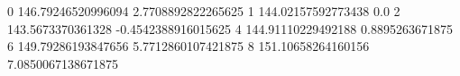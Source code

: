 0 146.79246520996094 2.7708892822265625
1 144.02157592773438 0.0
2 143.5673370361328 -0.4542388916015625
4 144.91110229492188 0.8895263671875
6 149.79286193847656 5.7712860107421875
8 151.10658264160156 7.0850067138671875

